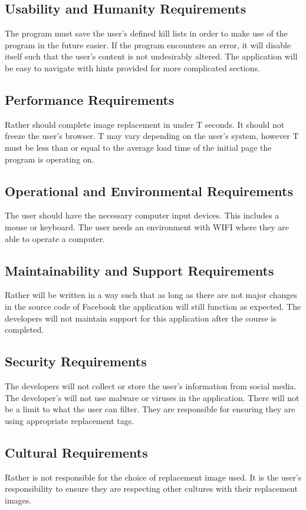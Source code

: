 \documentclass[12pt, titlepage]{article}
\begin{document}
\subsection{Usability and Humanity Requirements}
The program must save the user's defined kill lists in order to make use of the program in the future easier. If the program encounters an error, it will disable itself such that the user's content is not undesirably altered. The application will be easy to navigate with hints provided for more complicated sections.

\subsection{Performance Requirements}
Rather should complete image replacement in under T seconds. It should not freeze the user's browser. T may vary depending on the user's system, however T must be less than or equal to the average load time of the initial page the program is operating on.
\subsection{Operational and Environmental Requirements}
The user should have the necessary computer input devices. This includes a mouse or keyboard. The user needs an environment with WIFI where they are able to operate a computer.

\subsection{Maintainability and Support Requirements}
Rather will be written in a way such that as long as there are not major changes in the source code of Facebook the application will still function as expected. The developers will not maintain support for this application after the course is completed.

\subsection{Security Requirements}
The developers will not collect or store the user's information from social media. The developer's will not use malware or viruses %
in the application. There will not be a limit to what the user can filter. They are responsible for ensuring they are using appropriate replacement tags. 

\subsection{Cultural Requirements}
Rather is not responsible for the choice of replacement image used. It is the user's responsibility to ensure they are respecting other cultures with their replacement images.
\end{document}
